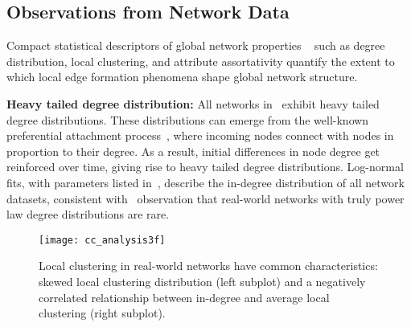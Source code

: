 %


\subsection{Observations from Network Data}
\label{subsec:factors}

Compact
statistical descriptors of global network properties ~\cite{newman2010networks}
such as degree distribution, local clustering, and attribute assortativity
quantify the extent to which local edge formation phenomena shape global network
structure.

\textbf{Heavy tailed degree distribution:} All networks in~ exhibit heavy tailed degree distributions. These
distributions can emerge from the well-known preferential attachment process~\cite{simon1955class,barabasi1999emergence}, where incoming nodes connect with nodes in proportion to their degree. As a result, initial differences in node
degree get reinforced over time, giving rise to heavy
tailed degree distributions.
Log-normal fits, with parameters listed in~, describe the in-degree
distribution of all network datasets, consistent with~\citet{broido2018scale} observation that real-world networks with truly power law
degree distributions are rare.

\begin{figure}[H]
 \vspace{-10pt}
 \centering
 \texttt{[image: cc\_analysis3f]}
 \caption{
    Local clustering in real-world networks have common characteristics:
    skewed local clustering distribution (left subplot) and a negatively correlated
    relationship between in-degree and average local clustering (right subplot).
 }
 \label{fig:cc_dc}
 \vspace{-10pt}
\end{figure}

